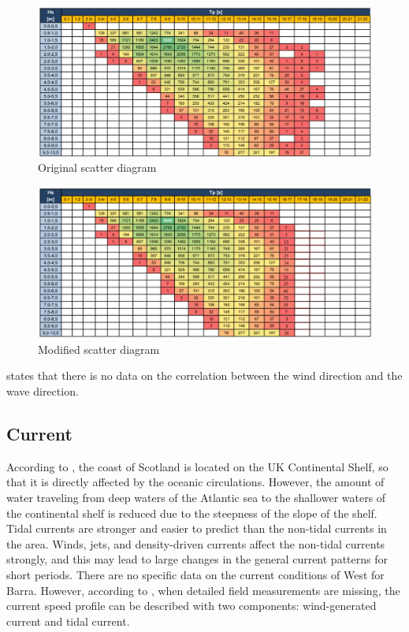 \begin{figure}[H]
\centering
\includegraphics[scale=0.5]{figures/scatteroriginal}
\caption[$\; \:$Original scatter diagram]{Original scatter diagram \cite{Lifes50+D1.1} }
 \label{fig:scato}
\end{figure}

\begin{figure}[H]
\centering
\includegraphics[scale=0.8]{figures/scatternew}
\caption[$\; \:$Modified scatter diagram ]{Modified scatter diagram  }
 \label{fig:scatn}
\end{figure}
 
 \noindent \cite{Lifes50+D1.1} states that there is no data on the correlation between the wind direction and the wave direction.
 \subsection{Current}
 \label{sec:current}
 According to \cite{Lifes50+D1.1}, the coast of Scotland is located on the UK Continental Shelf, so that it is directly affected by the oceanic circulations. However, the amount of water traveling from deep waters of the Atlantic sea to the shallower waters of the continental shelf is reduced due to the steepness of the slope of the shelf. Tidal currents are stronger and easier to predict than the non-tidal currents in the area. Winds, jets, and density-driven currents affect the non-tidal currents strongly, and this may lead to large changes in the general current patterns for short periods. There are no specific data on the current conditions of West for Barra. However, according to \cite{dnvenviroment}, when detailed field measurements are missing, the current speed profile can be described with two components: wind-generated current and tidal current. \newline
  \newline

